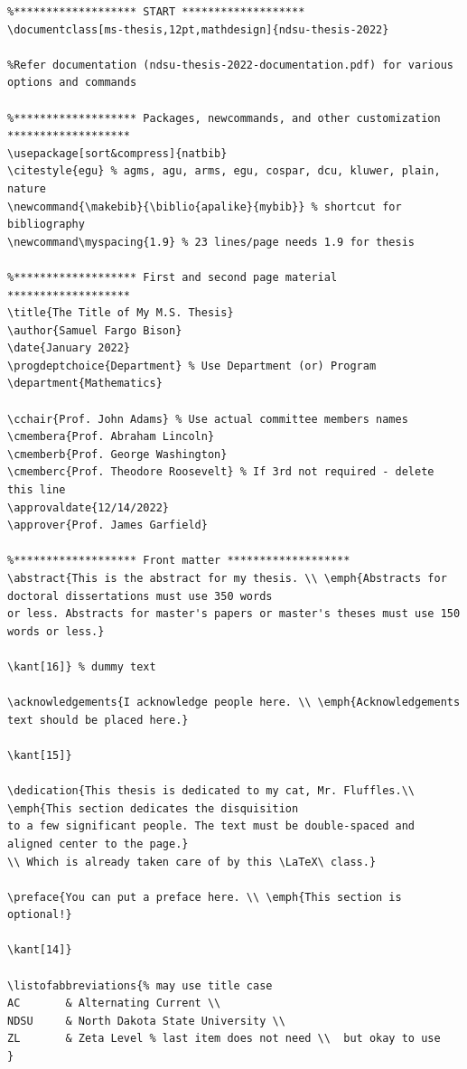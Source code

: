 \documentclass{article}
\begin{document}
{\scriptsize
\begin{verbatim}
%******************* START *******************
\documentclass[ms-thesis,12pt,mathdesign]{ndsu-thesis-2022}

%Refer documentation (ndsu-thesis-2022-documentation.pdf) for various options and commands

%******************* Packages, newcommands, and other customization *******************
\usepackage[sort&compress]{natbib}
\citestyle{egu} % agms, agu, arms, egu, cospar, dcu, kluwer, plain, nature
\newcommand{\makebib}{\biblio{apalike}{mybib}} % shortcut for bibliography
\newcommand\myspacing{1.9} % 23 lines/page needs 1.9 for thesis

%******************* First and second page material *******************
\title{The Title of My M.S. Thesis}
\author{Samuel Fargo Bison}
\date{January 2022}
\progdeptchoice{Department} % Use Department (or) Program
\department{Mathematics}

\cchair{Prof. John Adams} % Use actual committee members names 
\cmembera{Prof. Abraham Lincoln}
\cmemberb{Prof. George Washington}
\cmemberc{Prof. Theodore Roosevelt} % If 3rd not required - delete this line 
\approvaldate{12/14/2022}
\approver{Prof. James Garfield}

%******************* Front matter *******************
\abstract{This is the abstract for my thesis. \\ \emph{Abstracts for doctoral dissertations must use 350 words 
or less. Abstracts for master's papers or master's theses must use 150 words or less.}

\kant[16]} % dummy text

\acknowledgements{I acknowledge people here. \\ \emph{Acknowledgements text should be placed here.} 

\kant[15]}

\dedication{This thesis is dedicated to my cat, Mr. Fluffles.\\ \emph{This section dedicates the disquisition
to a few significant people. The text must be double-spaced and aligned center to the page.} 
\\ Which is already taken care of by this \LaTeX\ class.}

\preface{You can put a preface here. \\ \emph{This section is optional!} 

\kant[14]}

\listofabbreviations{% may use title case
AC       & Alternating Current \\
NDSU     & North Dakota State University \\
ZL       & Zeta Level % last item does not need \\  but okay to use
}


\end{verbatim}}
\end{document}
